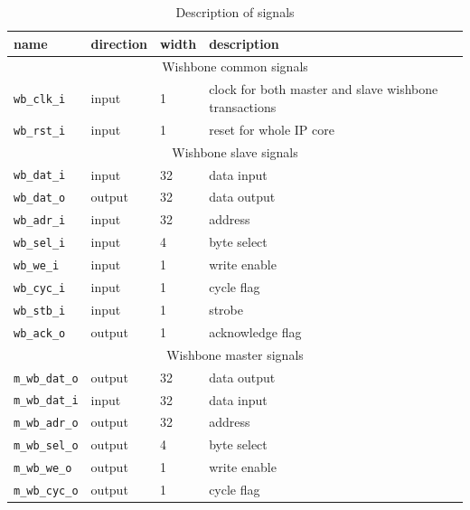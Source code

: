    \begin{table}
    \caption{Description of signals}
        \begin{center}
            \begin{tabular}{l|l|l|l}
                    \rowcolor[gray]{0.7} name & direction & width & description \\ \hline \hline
                    \multicolumn{4}{c}{Wishbone common signals} \\ \hline
                    \texttt{wb\_clk\_i} & input & 1 & clock for both master and slave wishbone transactions \\ \hline
                    \texttt{wb\_rst\_i} & input & 1 & reset for whole IP core \\ \hline
                    \multicolumn{4}{c}{Wishbone slave signals} \\ \hline
                    \texttt{wb\_dat\_i} & input & 32 & data input \\ \hline
                    \texttt{wb\_dat\_o} & output & 32 & data output \\ \hline
                    \texttt{wb\_adr\_i} & input & 32 & address \\ \hline
                    \texttt{wb\_sel\_i} & input & 4 & byte select \\ \hline
                    \texttt{wb\_we\_i} & input & 1 & write enable \\ \hline
                    \texttt{wb\_cyc\_i} & input & 1 & cycle flag \\ \hline
                    \texttt{wb\_stb\_i} & input & 1 & strobe \\ \hline
                    \texttt{wb\_ack\_o} & output & 1 & acknowledge flag \\ \hline
                    \multicolumn{4}{c}{Wishbone master signals} \\ \hline
                    \texttt{m\_wb\_dat\_o} & output & 32 & data output \\ \hline
                    \texttt{m\_wb\_dat\_i} & input & 32 & data input \\ \hline
                    \texttt{m\_wb\_adr\_o} & output & 32 & address \\ \hline
                    \texttt{m\_wb\_sel\_o} & output & 4 & byte select \\ \hline
                    \texttt{m\_wb\_we\_o} & output & 1 & write enable \\ \hline
                    \texttt{m\_wb\_cyc\_o} & output & 1 & cycle flag \\ \hline

\end{tabular}
\end{center}
\end{table}
